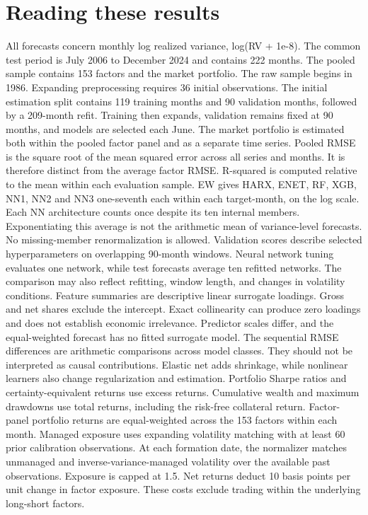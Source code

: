 \section*{Reading these results}
All forecasts concern monthly log realized variance, log(RV + 1e-8). The common test period is July 2006 to December 2024 and contains 222 months. The pooled sample contains 153 factors and the market portfolio. The raw sample begins in 1986. Expanding preprocessing requires 36 initial observations. The initial estimation split contains 119 training months and 90 validation months, followed by a 209-month refit. Training then expands, validation remains fixed at 90 months, and models are selected each June.
The market portfolio is estimated both within the pooled factor panel and as a separate time series.
Pooled RMSE is the square root of the mean squared error across all series and months. It is therefore distinct from the average factor RMSE. R-squared is computed relative to the mean within each evaluation sample.
EW gives HARX, ENET, RF, XGB, NN1, NN2 and NN3 one-seventh each within each target-month, on the log scale. Each NN architecture counts once despite its ten internal members. Exponentiating this average is not the arithmetic mean of variance-level forecasts. No missing-member renormalization is allowed.
Validation scores describe selected hyperparameters on overlapping 90-month windows. Neural network tuning evaluates one network, while test forecasts average ten refitted networks. The comparison may also reflect refitting, window length, and changes in volatility conditions.
Feature summaries are descriptive linear surrogate loadings. Gross and net shares exclude the intercept. Exact collinearity can produce zero loadings and does not establish economic irrelevance. Predictor scales differ, and the equal-weighted forecast has no fitted surrogate model.
The sequential RMSE differences are arithmetic comparisons across model classes. They should not be interpreted as causal contributions. Elastic net adds shrinkage, while nonlinear learners also change regularization and estimation.
Portfolio Sharpe ratios and certainty-equivalent returns use excess returns. Cumulative wealth and maximum drawdowns use total returns, including the risk-free collateral return. Factor-panel portfolio returns are equal-weighted across the 153 factors within each month.
Managed exposure uses expanding volatility matching with at least 60 prior calibration observations. At each formation date, the normalizer matches unmanaged and inverse-variance-managed volatility over the available past observations. Exposure is capped at 1.5. Net returns deduct 10 basis points per unit change in factor exposure. These costs exclude trading within the underlying long-short factors.
